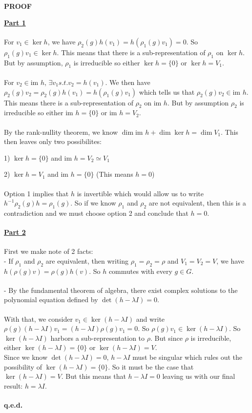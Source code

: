 \documentclass[9 pt]{report}
\begin{document}
\begin{center}
    \textbf{PROOF}
\end{center}
\underline{\textbf{Part 1}}
\\
\\
For $v_1 \in \ker h$, we have $\rho_2(g)h(v_1) = h(\rho_1(g)v_1)=0$. So $\rho_1(g)v_1 \in \ker h$. This means that there is a sub-representation of $\rho_1$ on $\ker h$. But by assumption, $\rho_1$ is irreducible so either $\ker h = \{0\}$ or $\ker h= V_1$.
\\
\\
For $v_2 \in \text{im } h$, $\exists v_1 s.t. v_2=h(v_1)$. We then have $\rho_2(g) v_2 = \rho_2(g)h(v_1) = h(\rho_1(g)v_1)$ which tells us that $\rho_2(g)v_2 \in \text{im }h$. This means there is a sub-representation of $\rho_2$ on $\text{im }h$. But by assumption $\rho_2$ is irreducible so either $\text{im }h = \{0\}$ or $\text{im }h = V_2$. 
\\
\\
By the rank-nullity theorem, we know $\dim \text{im }h + \dim \ker h = \dim V_1$. This then leaves only two possibilites:

 1)  $\ker h = \{0\}$ and $\text{im }h = V_2\simeq V_1$
 
 2) $\ker h = V_1$ and $\text{im }h = \{0\}$ (This means $h=0$)
 \\
 \\
Option 1 implies that $h$ is invertible which would allow us to write $h^{-1}\rho_2(g)h = \rho_1(g)$. So if we know $\rho_1$ and $\rho_2$ are not equivalent, then this is a contradiction and we must choose option 2 and conclude that $h=0$.
\\
\\
\underline{\textbf{Part 2}}
\\
\\
First we make note of 2 facts:
\\
- If $\rho_1$ and $\rho_2$ are equivalent, then writing $\rho_1=\rho_2=\rho$ and $V_1=V_2=V$, we have $h(\rho(g)v) = \rho(g)h(v)$. So $h$ commutes with every $g\in G$.
\\
\\
- By the fundamental theorem of algebra, there exist complex solutions to the polynomial equation defined by $\det (h-\lambda I)=0$.
\\
\\
With that, we consider $v_1\in \ker (h-\lambda I)$ and write $\rho(g)(h-\lambda I)v_1 = (h-\lambda I)\rho(g)v_1 = 0$. So $\rho(g)v_1 \in \ker (h - \lambda I)$. So $\ker (h-\lambda I)$ harbors a sub-representation to $\rho$. But since $\rho$ is irreducible, either $\ker (h-\lambda I)=\{0\}$ or $\ker (h-\lambda I) = V$.
\\
Since we know $\det(h-\lambda I)=0$, $h-\lambda I$ must be singular which rules out the possibility of $\ker (h-\lambda I)=\{0\}$. So it must be the case that $\ker(h-\lambda I) = V$. But this means that $h-\lambda I = 0$ leaving us with our final result: $h=\lambda I$.
\\
\\
\textbf{q.e.d.}
\end{document}

